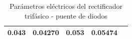 \begin{table}[]
\begin{tabular}{|cc|cc|lc|}
		\multicolumn{1}{|c|}{0.043}                                             & 0.04270                                           & \multicolumn{1}{c|}{0.053}                                           & 0.05474                                          & \multicolumn{2}{l|}{}                                                                                                                                                                                                                                                                    \\ \hline
	\end{tabular}
	\caption{Parámetros eléctricos del rectificador trifásico - puente de diodos}
	\label{tab:valores-rect-3p}
\end{table}

